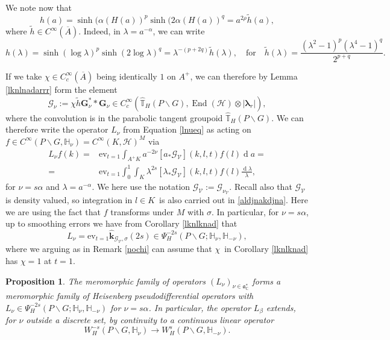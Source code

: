 \documentclass[a4paper,reqno]{amsart}
\numberwithin{equation}{section}
\def\End{\operatorname{End}}
\def\rd{\operatorname{d}\!}
\def\C{\mathbb{C}}
\def\T{\mathbb{T}}
\newtheorem{prop}[thm]{Proposition}
\theoremstyle{definition}
\theoremstyle{remark}
\begin{document}
We note now that 
$$h(a)=\sinh(\alpha(H(a))^p\sinh(2\alpha(H(a))^{q}=a^{2\rho}\tilde{h}(a),$$
where $\tilde{h}\in C^\infty(\overline{A})$. Indeed, in $\lambda=a^{-\alpha}$, we can write 
$$h(\lambda)=\sinh(\log \lambda)^p\sinh(2\log \lambda)^{q}=\lambda^{-(p+2q)}\tilde{h}(\lambda),\quad\mbox{for}\quad \tilde{h}(\lambda)=\frac{(\lambda^2-1)^p(\lambda^4-1)^q}{2^{p+q}}.$$

If we take $\chi\in C^\infty_c(\overline{A})$ being identically $1$ on $A^+$, we can therefore by Lemma \ref{lknlnadarrr} form the element
$$\pmb{\mathcal{G}}_\nu:=\chi\tilde{h}\pmb{G}_\nu^**\pmb{G}_\nu \in C^\infty_c(\hat{\T}_H(P\backslash G),\End(\mathcal{H})\otimes |\pmb{\lambda}_r|),$$
where the convolution is in the parabolic tangent groupoid $\hat{\T}_H(P\backslash G)$. We can therefore write the operator $L_\nu$ from Equation \eqref{lnueq} as acting on $f\in C^\infty(P\backslash G,\mathbb{H}_\nu)=C^\infty(K,\mathcal{H})^M$ via
\begin{align}
\label{aldjnakdjna}
L_{\nu}f(k)=&\mathrm{ev}_{t=1}\int_{A^+K} a^{-2\nu} [a_*\pmb{\mathcal{G}}_{\mathcal{V}}](k,l,t)f(l)\rd a=\\
\nonumber 
=&\mathrm{ev}_{t=1}\int_0^1\int_K \lambda^{2s} [\lambda_*\pmb{\mathcal{G}}_{\mathcal{V}}](k,l,t)f(l)\frac{\rd \lambda}{\lambda},
\end{align}
for $\nu=s\alpha$ and $\lambda=a^{-\alpha}$. We here use the notation $\pmb{\mathcal{G}}_{\mathcal{V}}:=\pmb{\mathcal{G}}_{\nu_{\mathcal{V}}}$. Recall also that $\pmb{\mathcal{G}}_{\mathcal{V}}$ is density valued, so integration in $l\in K$ is also carried out in \eqref{aldjnakdjna}. Here we are using the fact that $f$ transforms under $M$ with $\sigma$. In particular, for $\nu=s\alpha$, up to smoothing errors we have from Corollary \ref{lknlknad} that 
\begin{equation}
\label{blablathun}
L_\nu=\mathrm{ev}_{t=1}\hat{\pmb{k}}_{\pmb{\mathcal{G}}_{\mathcal{V}},\sigma}(2s)\in \Psi^{-2s}_H(P\backslash G;\mathbb{H}_\nu,\mathbb{H}_{-\nu}),
\end{equation}
where we arguing as in Remark \ref{nochi} can assume that $\chi$ in Corollary \ref{lknlknad} has $\chi=1$ at $t=1$.


\begin{prop}
\label{lnudadnadlp}
The meromorphic family of operators $(L_\nu)_{\nu \in \mathfrak{a}^*_\C}$ forms a meromorphic family of Heisenberg pseudodifferential operators with $L_{\nu}\in \Psi^{-2s}_H(P\backslash G; \mathbb{H}_\nu,\mathbb{H}_{-\nu})$ for $\nu=s\alpha$. In particular, the operator $L_\beta$ extends, for $\nu$ outside a discrete set, by continuity to a continuous linear operator
$$W^{-s}_{H}(P\backslash G, \mathbb{H}_{\nu})\to W^{s}_{H}(P\backslash G, \mathbb{H}_{-\nu}).$$
\end{prop}
\end{document}
